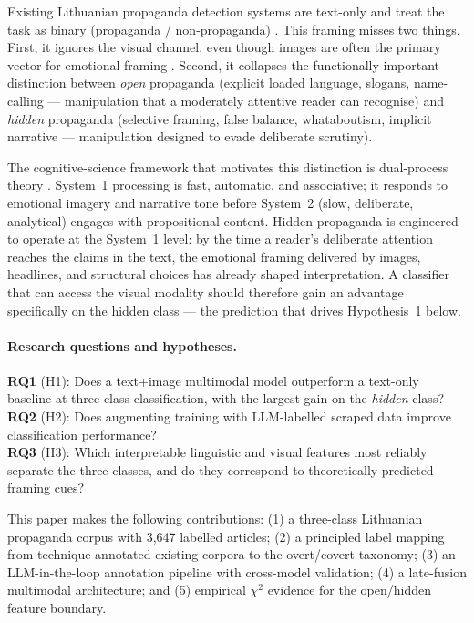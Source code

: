 \documentclass[12pt,a4paper]{article}
\begin{document}
Existing Lithuanian propaganda detection systems are text-only and treat the
task as binary (propaganda / non-propaganda)
\parencite{haltprop2025,vasnetsov2026dualinput}.
This framing misses two things.
First, it ignores the visual channel, even though images are often the primary
vector for emotional framing \parencite{entman1993framing}.
Second, it collapses the functionally important distinction between
\emph{open} propaganda (explicit loaded language, slogans, name-calling ---
manipulation that a moderately attentive reader can recognise) and
\emph{hidden} propaganda (selective framing, false balance, whataboutism,
implicit narrative --- manipulation designed to evade deliberate scrutiny).

The cognitive-science framework that motivates this distinction is dual-process
theory \parencite{kahneman2011thinking}.
System~1 processing is fast, automatic, and associative; it responds to
emotional imagery and narrative tone before System~2 (slow, deliberate,
analytical) engages with propositional content.
Hidden propaganda is engineered to operate at the System~1 level: by the time
a reader's deliberate attention reaches the claims in the text, the emotional
framing delivered by images, headlines, and structural choices has already
shaped interpretation.
A classifier that can access the visual modality should therefore gain an
advantage specifically on the hidden class --- the prediction that drives
Hypothesis~1 below.

\paragraph{Research questions and hypotheses.}
\textbf{RQ1} (H1): Does a text+image multimodal model outperform a text-only
baseline at three-class classification, with the largest gain on the
\emph{hidden} class?\\
\textbf{RQ2} (H2): Does augmenting training with LLM-labelled scraped data
improve classification performance?\\
\textbf{RQ3} (H3): Which interpretable linguistic and visual features most
reliably separate the three classes, and do they correspond to theoretically
predicted framing cues?

This paper makes the following contributions: (1) a three-class Lithuanian
propaganda corpus with 3,647 labelled articles; (2) a principled label mapping
from technique-annotated existing corpora to the overt/covert taxonomy;
(3) an LLM-in-the-loop annotation pipeline with cross-model validation;
(4) a late-fusion multimodal architecture; and (5) empirical $\chi^2$ evidence
for the open/hidden feature boundary.
\end{document}
